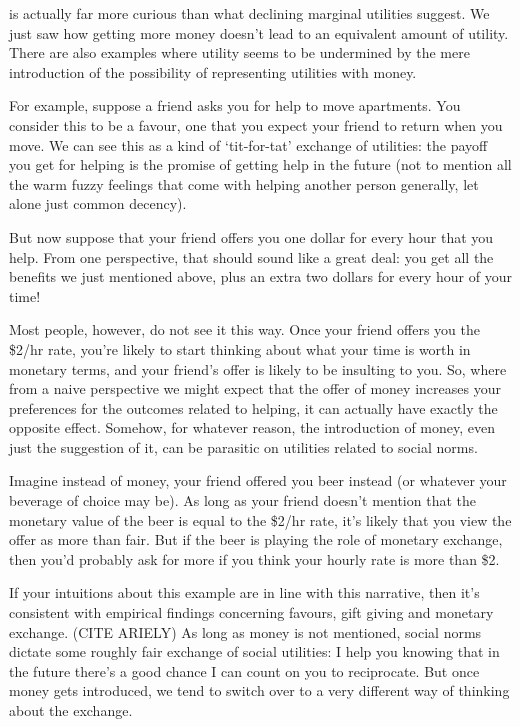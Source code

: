 \documentclass[]{tufte-book}
\begin{document}
 is actually far more curious than what declining marginal utilities suggest. We just saw how getting more money doesn't lead to an equivalent amount of utility. There are also examples where utility seems to be undermined by the mere introduction of the possibility of representing utilities with money.

For example, suppose a friend asks you for help to move apartments. You consider this to be a favour, one that you expect your friend to return when you move. We can see this as a kind of `tit-for-tat' exchange of utilities: the payoff you get for helping is the promise of getting help in the future (not to mention all the warm fuzzy feelings that come with helping another person generally, let alone just common decency).

But now suppose that your friend offers you one dollar for every hour that you help. From one perspective, that should sound like a great deal: you get all the benefits we just mentioned above, plus an extra two dollars for every hour of your time!

Most people, however, do not see it this way. Once your friend offers you the \$2/hr rate, you're likely to start thinking about what your time is worth in monetary terms, and your friend's offer is likely to be insulting to you. So, where from a naive perspective we might expect that the offer of money increases your preferences for the outcomes related to helping, it can actually have exactly the opposite effect. Somehow, for whatever reason, the introduction of money, even just the suggestion of it, can be parasitic on utilities related to social norms.

 Imagine instead of money, your friend offered you beer instead (or whatever your beverage of choice may be). As long as your friend doesn't mention that the monetary value of the beer is equal to the \$2/hr rate, it's likely that you view the offer as more than fair. But if the beer is playing the role of monetary exchange, then you'd probably ask for more if you think your hourly rate is more than \$2.

If your intuitions about this example are in line with this narrative, then it's consistent with empirical findings concerning favours, gift giving and monetary exchange. (CITE ARIELY) As long as money is not mentioned, social norms dictate some roughly fair exchange of social utilities: I help you knowing that in the future there's a good chance I can count on you to reciprocate. But once money gets introduced, we tend to switch over to a very different way of thinking about the exchange.
\end{document}
